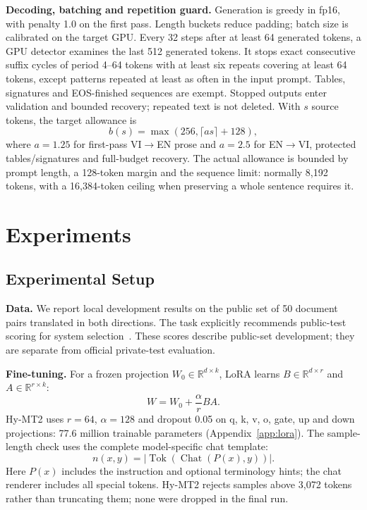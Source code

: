 \documentclass[11pt]{article}
\newcommand{\envi}{EN$\rightarrow$VI}
\newcommand{\vien}{VI$\rightarrow$EN}
\begin{document}
\textbf{Decoding, batching and repetition guard.} Generation is greedy in fp16, with penalty 1.0 on the first pass. Length buckets reduce padding; batch size is calibrated on the target GPU. Every 32 steps after at least 64 generated tokens, a GPU detector examines the last 512 generated tokens. It stops exact consecutive suffix cycles of period 4--64 tokens with at least six repeats covering at least 64 tokens, except patterns repeated at least as often in the input prompt. Tables, signatures and EOS-finished sequences are exempt. Stopped outputs enter validation and bounded recovery; repeated text is not deleted. With $s$ source tokens, the target allowance is
\begin{equation}
b(s)=\max(256,\lceil a s\rceil+128),
\label{eq:budget}
\end{equation}
where $a=1.25$ for first-pass \vien{} prose and $a=2.5$ for \envi{}, protected tables/signatures and full-budget recovery. The actual allowance is bounded by prompt length, a 128-token margin and the sequence limit: normally 8,192 tokens, with a 16,384-token ceiling when preserving a whole sentence requires it.

\section{Experiments}\label{sec:experiments}
\subsection{Experimental Setup}
\textbf{Data.} We report local development results on the public set of 50 document pairs translated in both directions. The task explicitly recommends public-test scoring for system selection~\cite{vlsp2026}. These scores describe public-set development; they are separate from official private-test evaluation.

\textbf{Fine-tuning.} For a frozen projection $W_0\in\mathbb{R}^{d\times k}$, LoRA learns $B\in\mathbb{R}^{d\times r}$ and $A\in\mathbb{R}^{r\times k}$:
\begin{equation}
W=W_0+\frac{\alpha}{r}BA.
\label{eq:lora}
\end{equation}
Hy-MT2 uses $r=64$, $\alpha=128$ and dropout 0.05 on q, k, v, o, gate, up and down projections: 77.6 million trainable parameters (Appendix~\ref{app:lora}). The sample-length check uses the complete model-specific chat template:
\begin{equation}
n(x,y)=\big|\operatorname{Tok}(\operatorname{Chat}(P(x),y))\big|.
\label{eq:len}
\end{equation}
Here $P(x)$ includes the instruction and optional terminology hints; the chat renderer includes all special tokens. Hy-MT2 rejects samples above 3,072 tokens rather than truncating them; none were dropped in the final run.
\end{document}
